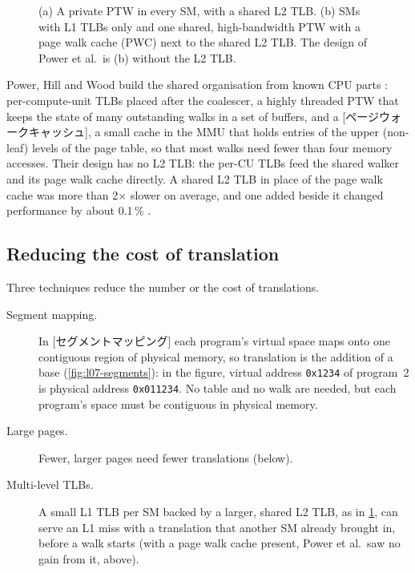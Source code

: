 \documentclass[../main.tex]{subfiles}
\begin{document}
\begin{figure}[tb]
  \centering
  
  \caption{(a) A private PTW in every SM, with a shared L2 TLB.
    (b) SMs with L1 TLBs only and one shared, high-bandwidth PTW with
    a page walk cache (PWC) next to the shared L2 TLB.  The design of
    Power et al.\ is (b) without the L2 TLB.}
  \label{fig:l07-ptw-sharing}
\end{figure}

Power, Hill and Wood build the shared organisation from known CPU
parts \cite{power2014x86}: per-compute-unit TLBs placed after the
coalescer, a highly threaded PTW that keeps the state of many
outstanding walks in a set of buffers, and a
[ページウォークキャッシュ], a small cache in the
MMU that holds entries of the upper (non-leaf) levels of the page
table, so that most walks need fewer than four memory
accesses.  Their design has
no L2 TLB: the per-CU TLBs feed the shared walker and its page walk
cache directly.  A shared L2 TLB in place of the page walk cache was
more than 2$\times$ slower on average, and one added beside it changed
performance by about 0.1\,\% \cite[§6]{power2014x86}.

\subsection{Reducing the cost of translation}

Three techniques reduce the number or the cost of
translations.
\begin{marginfigure}
  
  \caption{Segment mapping: three programs with the same virtual range
    in three \SI{64}{\kibi\byte} physical segments.}
  \label{fig:l07-segments}
\end{marginfigure}
\begin{description}
  \item[Segment mapping.]  In [セグメントマッピング]
    each program's virtual space maps onto one contiguous region of
    physical memory, so translation is the addition of a base
    (\cref{fig:l07-segments}): in the figure, virtual address
    \texttt{0x1234} of program~2 is physical address
    \texttt{0x011234}.  No table and no walk are needed, but each
    program's space must be contiguous in physical memory.
  \item[Large pages.]  Fewer, larger pages need fewer translations
    (below).
  \item[Multi-level TLBs.]  A small L1 TLB per SM backed by a larger,
    shared L2 TLB, as in \cref{fig:l07-ptw-sharing}, can serve an L1
    miss with a translation that another SM already brought in, before
    a walk starts (with a page walk cache present, Power et al.\ saw no
    gain from it, above).
\end{description}
\end{document}
